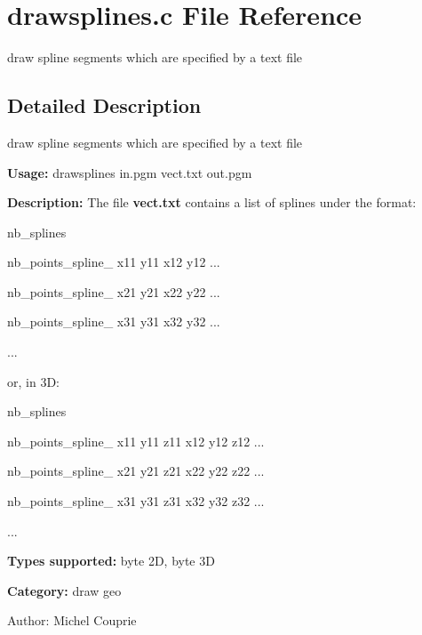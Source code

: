 \section{drawsplines.c File Reference}
\label{drawsplines_8c}
draw spline segments which are specified by a text file 



\subsection{Detailed Description}
draw spline segments which are specified by a text file 

{\bf Usage:} drawsplines in.pgm vect.txt out.pgm

{\bf Description:} The file {\bf vect.txt} contains a list of splines under the format:\par
 nb\_\-splines\par
 nb\_\-points\_\-spline\_ x11 y11 x12 y12 ...\par
 nb\_\-points\_\-spline\_ x21 y21 x22 y22 ...\par
 nb\_\-points\_\-spline\_ x31 y31 x32 y32 ...\par
 ...\par
 or, in 3D:\par
 nb\_\-splines\par
 nb\_\-points\_\-spline\_ x11 y11 z11 x12 y12 z12 ...\par
 nb\_\-points\_\-spline\_ x21 y21 z21 x22 y22 z22 ...\par
 nb\_\-points\_\-spline\_ x31 y31 z31 x32 y32 z32 ...\par
 ...\par


{\bf Types supported:} byte 2D, byte 3D

{\bf Category:} draw geo

\begin{Desc}
\item[Author:]Michel Couprie \end{Desc}
